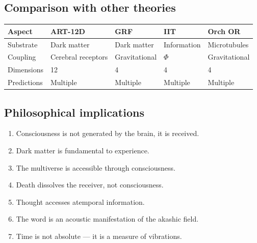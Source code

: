 \subsection{Comparison with other theories}
\begin{table}[H]
\centering
\begin{tabular}{@{}lllll@{}}
\toprule
\textbf{Aspect} & \textbf{ART-12D} & \textbf{GRF} & \textbf{IIT} & \textbf{Orch OR} \\ \midrule
Substrate & Dark matter & Dark matter & Information & Microtubules \\
Coupling & Cerebral receptors & Gravitational & $\Phi$ & Gravitational \\
Dimensions & 12 & 4 & 4 & 4 \\
Predictions & Multiple & Multiple & Multiple & Multiple \\ \bottomrule
\end{tabular}
\end{table}

\subsection{Philosophical implications}
\begin{enumerate}
    \item Consciousness is not generated by the brain, it is received.
    \item Dark matter is fundamental to experience.
    \item The multiverse is accessible through consciousness.
    \item Death dissolves the receiver, not consciousness.
    \item Thought accesses atemporal information.
    \item The word is an acoustic manifestation of the akashic field.
    \item Time is not absolute --- it is a measure of vibrations.
\end{enumerate}

